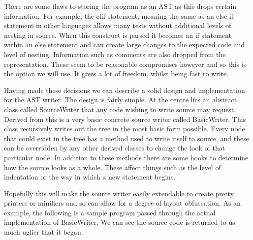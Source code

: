 \documentclass{report}
\begin{document}
There are some flaws to storing the program as an AST as this drops certain information.
For example, the elif statement, meaning the same as an else if statement in other languages allows many tests without additional levels of nesting in source.
When this construct is parsed it becomes an if statement within an else statement and can create large changes to the expected code and level of nesting. Information
such as comments are also dropped from the representation. These seem to be reasonable compromises however and so this is the option we will use. It gives
a lot of freedom, whilst being fast to write.

Having made these decisions we can describe a solid design and implementation for the AST writer. The design is fairly simple.
At the centre lies an abstract class called SourceWriter that any code wishing to write source may request. Derived from this
is a very basic concrete source writer called BasicWriter. This class recursively writes out the tree in the
most basic form possible. Every node that could exist in the tree has a method used to write itself to source, and these can be overridden by any
other derived classes to change the look of that particular node. In addition to these methods there are some hooks to determine how
the source looks as a whole. These affect things such as the level of indentation or the way in which a new statement begins.

Hopefully this will make the source writer easily extendable to create pretty printers or minifiers and so can allow for a degree of layout
obfuscation. As an example, the following is a sample program passed through the actual implementation of BasicWriter. We can see the source code
is returned to us much uglier that it began.
\end{document}
